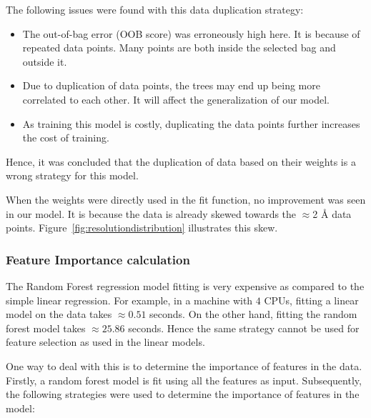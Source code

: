 \documentclass[11pt]{article}
\begin{document}
The following issues were found with this data duplication strategy:
\begin{itemize}
\item The out-of-bag error (OOB score) was erroneously high here. It is because of repeated data points. Many points are both inside the selected bag and outside it.
\item Due to duplication of data points,  the trees may end up being more correlated to each other.  It will affect the generalization of our model.
\item As training this model is costly, duplicating the data points further increases the cost of training.
\end{itemize}
Hence, it was concluded that the duplication of data based on their weights is a wrong strategy for this model.

When the weights were directly used in the fit function, no improvement was seen in our model.
It is because the data is already skewed towards the $\approx$2 \si{\angstrom}
data points.
Figure~\ref{fig:resolutiondistribution} illustrates this skew.

\subsubsection{Feature Importance calculation}
The Random Forest regression model fitting is very expensive as compared to the simple linear regression.
For example, in a machine with $4$ CPUs,  fitting a linear model on the data takes $\approx 0.51$ seconds. On the other hand, fitting the random forest model takes $\approx 25.86$ seconds.
Hence the same strategy cannot be used for feature selection as used in the linear models.

One way to deal with this is to determine the importance of features in the data. Firstly, a random forest model is fit using all the features as input. Subsequently, the following strategies were used to determine the importance of features in the model:
\end{document}
